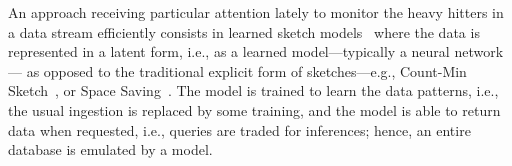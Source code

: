 An approach receiving particular attention lately to monitor the heavy hitters in a data stream efficiently consists in learned sketch models~\cite{hsu2019learning,kristo2020case,patil2021latest} where the data is represented in a latent form, i.e., as a learned model---typically a neural network--- as opposed to the traditional explicit form of sketches---e.g., Count-Min Sketch~\cite{cormode2005improved}, or Space Saving~\cite{mitzenmacher2012hierarchical}. The model is trained to learn the data patterns, i.e., the usual ingestion is replaced by some training, and the model is able to return data when requested, i.e., queries are traded for inferences; hence, an entire database is emulated by a model.

